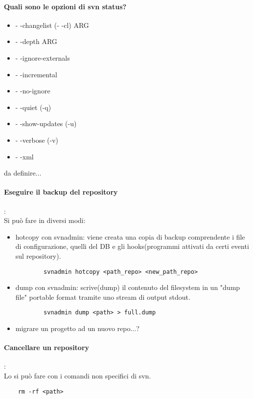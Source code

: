 \documentclass[a4paper]{article}
\begin{document}
	\paragraph{Quali sono le opzioni di svn status?}
	\begin{itemize}
		
		
		\item - -changelist (- -cl) ARG
		\item - -depth ARG
		\item - -ignore-externals
		\item - -incremental
		\item - -no-ignore
		\item - -quiet (-q)
		\item - -show-updates (-u)
		\item - -verbose (-v)
		\item - -xml
		
	\end{itemize}
	da definire...
	\paragraph{Eseguire il backup del repository}: \\
	Si può fare in diversi modi:
	\begin{itemize}
		\item hotcopy con svnadmin: viene creata una copia di backup comprendente i file di configurazione, quelli del DB e gli hooks(programmi attivati da certi eventi sul repository). \begin{verbatim}
		svnadmin hotcopy <path_repo> <new_path_repo>
		\end{verbatim}
		\item dump con svnadmin: scrive(dump) il contenuto del filesystem in un "dump file" portable format tramite uno stream di output stdout.\begin{verbatim}
		svnadmin dump <path> > full.dump
		\end{verbatim}
		
		\item migrare un progetto ad un nuovo repo...?
		
	\end{itemize}
	\paragraph{Cancellare un repository}: \\
	Lo si può fare con i comandi non specifici di svn.
	\begin{verbatim}
	rm -rf <path>
	\end{verbatim}
	
\end{document}
